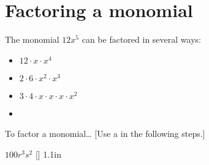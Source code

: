 \section{Factoring a monomial}

The monomial $12x^5$ can be factored in several ways:

\begin{minipage}{0.49\textwidth}
\begin{itemize}[nosep]
    \item $12 \cdot x \cdot x^4 $
    \item $ 2 \cdot 6 \cdot x^2 \cdot x^3 $
\end{itemize}
\end{minipage}
\begin{minipage}{0.49\textwidth}
    \begin{itemize}[nosep]
        \item $ 3 \cdot 4 \cdot x \cdot x \cdot x \cdot x^2 $
        \item {}
    \end{itemize}
\end{minipage}
    
\begin{myConceptSteps}{To  factor a monomial\dots}
    [Use a   in the following steps.]
\end{myConceptSteps}


    {
        \centering $ 100 r^3s^2 $
    }
    [\large]
    {1.1in}


